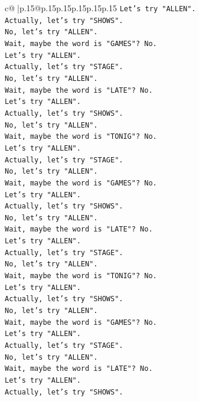 \documentclass{article}
\begin{document}
{\begin{supertabular}{c@{$\;$}|p{.15\linewidth}@{}p{.15\linewidth}p{.15\linewidth}p{.15\linewidth}p{.15\linewidth}p{.15\linewidth}}
{{{\texttt{Let's try "ALLEN".} \\
\texttt{Actually, let's try "SHOWS".} \\
\texttt{No, let's try "ALLEN".} \\
\texttt{Wait, maybe the word is "GAMES"? No.} \\
\texttt{Let's try "ALLEN".} \\
\texttt{Actually, let's try "STAGE".} \\
\texttt{No, let's try "ALLEN".} \\
\texttt{Wait, maybe the word is "LATE"? No.} \\
\texttt{Let's try "ALLEN".} \\
\texttt{Actually, let's try "SHOWS".} \\
\texttt{No, let's try "ALLEN".} \\
\texttt{Wait, maybe the word is "TONIG"? No.} \\
\texttt{Let's try "ALLEN".} \\
\texttt{Actually, let's try "STAGE".} \\
\texttt{No, let's try "ALLEN".} \\
\texttt{Wait, maybe the word is "GAMES"? No.} \\
\texttt{Let's try "ALLEN".} \\
\texttt{Actually, let's try "SHOWS".} \\
\texttt{No, let's try "ALLEN".} \\
\texttt{Wait, maybe the word is "LATE"? No.} \\
\texttt{Let's try "ALLEN".} \\
\texttt{Actually, let's try "STAGE".} \\
\texttt{No, let's try "ALLEN".} \\
\texttt{Wait, maybe the word is "TONIG"? No.} \\
\texttt{Let's try "ALLEN".} \\
\texttt{Actually, let's try "SHOWS".} \\
\texttt{No, let's try "ALLEN".} \\
\texttt{Wait, maybe the word is "GAMES"? No.} \\
\texttt{Let's try "ALLEN".} \\
\texttt{Actually, let's try "STAGE".} \\
\texttt{No, let's try "ALLEN".} \\
\texttt{Wait, maybe the word is "LATE"? No.} \\
\texttt{Let's try "ALLEN".} \\
\texttt{Actually, let's try "SHOWS".} \\
}}}
\end{supertabular}}
\end{document}
